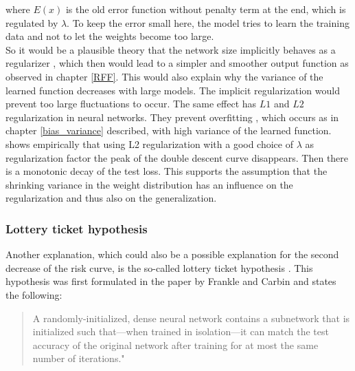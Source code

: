 where $E(x)$ is the old error function without penalty term at the end, which is regulated by $\lambda$. To keep the error small here, the model tries to learn the training data and not to let the weights become too large. \\
So it would be a plausible theory that the network size implicitly behaves as a regularizer \cite{A_least_squre_study}, which then would lead to a simpler and smoother output function as observed in chapter \ref{RFF}. This would also explain why the variance of the learned function decreases with large models. The implicit regularization would prevent too large fluctuations to occur. The same effect has $L1$ and $L2$ regularization in neural networks. They prevent overfitting \cite{regularization_L1_L2}, which occurs as in chapter \ref{bias_variance} described, with high variance of the learned function.\\
\cite{l2_regularization_double_descent} shows empirically that using L2 regularization with a good choice of $\lambda$ as regularization factor the peak of the double descent curve disappears. Then there is a monotonic decay of the test loss. This supports the assumption that the shrinking variance in the weight distribution has an influence on the regularization and thus also on the generalization.




\subsubsection{Lottery ticket hypothesis}
Another explanation, which could also be a possible explanation for the second decrease of the risk curve, is the so-called lottery ticket hypothesis \cite{understanding_double_ticket}.
This hypothesis was first formulated in the paper by Frankle and Carbin \cite{lottery_ticket} and states the following: %
\\
\begin{quote}
A randomly-initialized, dense neural network contains a subnetwork that is initialized such that—when trained in isolation—it can match the test accuracy of the
original network after training for at most the same number of iterations."\cite{lottery_ticket}
\end{quote}

